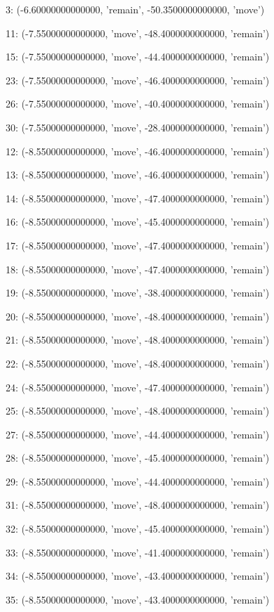 3: (-6.60000000000000, 'remain', -50.3500000000000, 'move')


11: (-7.55000000000000, 'move', -48.4000000000000, 'remain')


15: (-7.55000000000000, 'move', -44.4000000000000, 'remain')


23: (-7.55000000000000, 'move', -46.4000000000000, 'remain')


26: (-7.55000000000000, 'move', -40.4000000000000, 'remain')


30: (-7.55000000000000, 'move', -28.4000000000000, 'remain')


12: (-8.55000000000000, 'move', -46.4000000000000, 'remain')


13: (-8.55000000000000, 'move', -46.4000000000000, 'remain')


14: (-8.55000000000000, 'move', -47.4000000000000, 'remain')


16: (-8.55000000000000, 'move', -45.4000000000000, 'remain')


17: (-8.55000000000000, 'move', -47.4000000000000, 'remain')


18: (-8.55000000000000, 'move', -47.4000000000000, 'remain')


19: (-8.55000000000000, 'move', -38.4000000000000, 'remain')


20: (-8.55000000000000, 'move', -48.4000000000000, 'remain')


21: (-8.55000000000000, 'move', -48.4000000000000, 'remain')


22: (-8.55000000000000, 'move', -48.4000000000000, 'remain')


24: (-8.55000000000000, 'move', -47.4000000000000, 'remain')


25: (-8.55000000000000, 'move', -48.4000000000000, 'remain')


27: (-8.55000000000000, 'move', -44.4000000000000, 'remain')


28: (-8.55000000000000, 'move', -45.4000000000000, 'remain')


29: (-8.55000000000000, 'move', -44.4000000000000, 'remain')


31: (-8.55000000000000, 'move', -48.4000000000000, 'remain')


32: (-8.55000000000000, 'move', -45.4000000000000, 'remain')


33: (-8.55000000000000, 'move', -41.4000000000000, 'remain')


34: (-8.55000000000000, 'move', -43.4000000000000, 'remain')


35: (-8.55000000000000, 'move', -43.4000000000000, 'remain')


